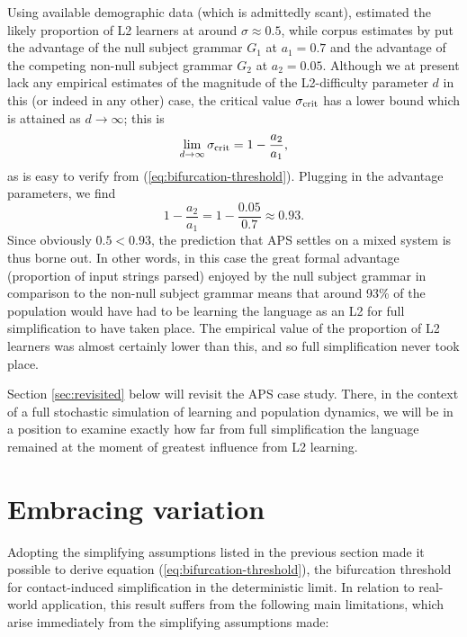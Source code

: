 Using available demographic data (which is admittedly scant),
\textcite{Kauhanen2022} estimated the likely proportion of L2 learners
at around \(\sigma \approx 0.5\), while corpus estimates by
\textcite{SimEtAl2019} put the advantage of the null subject grammar
\(G_1\) at \(a_1 = 0.7\) and the advantage of the competing non-null
subject grammar \(G_2\) at \(a_2 = 0.05\). Although we at present lack
any empirical estimates of the magnitude of the L2-difficulty parameter
\(d\) in this (or indeed in any other) case, the critical value
\(\sigma_\textnormal{crit}\) has a lower bound which is attained as
\(d \to \infty\); this is \begin{equation}
\lim_{d \to \infty} \sigma_{\textnormal{crit}} = 1 - \frac{a_2}{a_1},
\label{eq:limit-of-sigma-crit}\end{equation} as is easy to verify from
(\ref{eq:bifurcation-threshold}). Plugging in the advantage parameters,
we find \begin{equation}
1 - \frac{a_2}{a_1} = 1 - \frac{0.05}{0.7} \approx 0.93.
\label{eq:aps-sigma-crit}\end{equation} Since obviously \(0.5 < 0.93\),
the prediction that APS settles on a mixed system is thus borne out. In
other words, in this case the great formal advantage (proportion of
input strings parsed) enjoyed by the null subject grammar in comparison
to the non-null subject grammar means that around 93\% of the population
would have had to be learning the language as an L2 for full
simplification to have taken place. The empirical value of the
proportion of L2 learners was almost certainly lower than this, and so
full simplification never took place.

Section \ref{sec:revisited} below will revisit the APS case study.
There, in the context of a full stochastic simulation of learning and
population dynamics, we will be in a position to examine exactly how far
from full simplification the language remained at the moment of greatest
influence from L2 learning.

\hypertarget{sec:embracing-variation}{%
\section{Embracing variation}\label{sec:embracing-variation}}

Adopting the simplifying assumptions listed in the previous section made
it possible to derive equation (\ref{eq:bifurcation-threshold}), the
bifurcation threshold for contact-induced simplification in the
deterministic limit. In relation to real-world application, this result
suffers from the following main limitations, which arise immediately
from the simplifying assumptions made:

